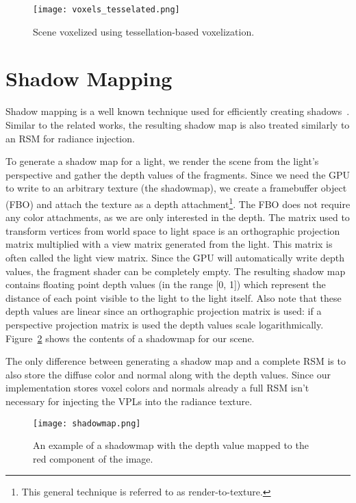 \begin{figure}[h!]
\centering
    \texttt{[image: voxels\_tesselated.png]}
    \caption{Scene voxelized using tessellation-based voxelization.}
    \label{fig:tesselatedvoxels}
\end{figure}

\section{Shadow Mapping}
Shadow mapping is a well known technique used for efficiently creating shadows~\cite{Williams:1978:CCS:965139.807402}. Similar to the related works, the resulting shadow map is also treated similarly to an RSM for radiance injection.

To generate a shadow map for a light, we render the scene from the light's perspective and gather the depth values of the fragments. Since we need the GPU to write to an arbitrary texture (the shadowmap), we create a framebuffer object (FBO) and attach the texture as a depth attachment\footnote{This general technique is referred to as render-to-texture.}. The FBO does not require any color attachments, as we are only interested in the depth. The matrix used to transform vertices from world space to light space is an orthographic projection matrix multiplied with a view matrix generated from the light. This matrix is often called the light view matrix. Since the GPU will automatically write depth values, the fragment shader can be completely empty. The resulting shadow map contains floating point depth values (in the range [0, 1]) which represent the distance of each point visible to the light to the light itself. Also note that these depth values are linear since an orthographic projection matrix is used: if a perspective projection matrix is used the depth values scale logarithmically. Figure~\ref{fig:shadowmap} shows the contents of a shadowmap for our scene.

The only difference between generating a shadow map and a complete RSM is to also store the diffuse color and normal along with the depth values. Since our implementation stores voxel colors and normals already a full RSM isn't necessary for injecting the VPLs into the radiance texture.

\begin{figure}[h!]
\centering
    \texttt{[image: shadowmap.png]}
    \caption{An example of a shadowmap with the depth value mapped to the red component of the image.}
    \label{fig:shadowmap}
\end{figure}

